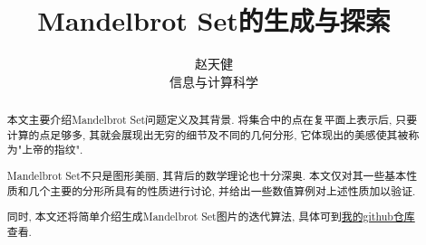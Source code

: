 \documentclass{ctexart}
\title{Mandelbrot Set的生成与探索}
\author{赵天健 \\ 信息与计算科学\quad 3210101830}
\begin{document}
\maketitle

\begin{abstract}
本文主要介绍Mandelbrot Set问题定义及其背景. 将集合中的点在复平面上表示后, 只要计算的点足够多, 其就会展现出无穷的细节及不同的几何分形, 它体现出的美感使其被称为"上帝的指纹". 
\par Mandelbrot Set不只是图形美丽, 其背后的数学理论也十分深奥. 本文仅对其一些基本性质和几个主要的分形所具有的性质进行讨论, 并给出一些数值算例对上述性质加以验证.
\par 同时, 本文还将简单介绍生成Mandelbrot Set图片的迭代算法, 具体可到\href{https://github.com/0OO00OO0/MandelbrotSet}{我的github仓库} 查看.
\end{abstract}
\end{document}
